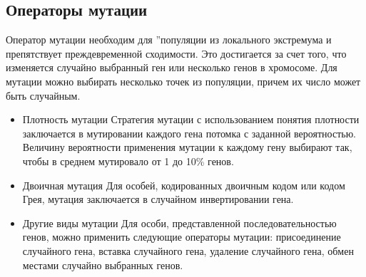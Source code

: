 \begin{itemize}
\section{Операторы мутации}
Оператор мутации необходим для \textquotedblright популяции из локального экстремума и препятствует преждевременной сходимости. Это достигается за счет того, что изменяется случайно выбранный ген или несколько генов в хромосоме. Для мутации можно выбирать несколько точек из популяции, причем их число может быть случайным.
\begin{itemize}[label=$\ast$]
	\item Плотность мутации
Стратегия мутации с использованием понятия плотности заключается в мутировании каждого гена потомка с заданной вероятностью. Величину вероятности применения мутации к каждому гену выбирают так, чтобы в среднем мутировало от 1 до 10\% генов.
	\item Двоичная мутация
Для особей, кодированных двоичным кодом или кодом Грея, мутация заключается в случайном инвертировании гена.
	\item Другие виды мутации
Для особи, представленной последовательностью генов, можно применить следующие операторы мутации: присоединение случайного гена, вставка случайного гена, удаление случайного гена, обмен местами случайно выбранных генов.
\end{itemize}


\end{itemize}
